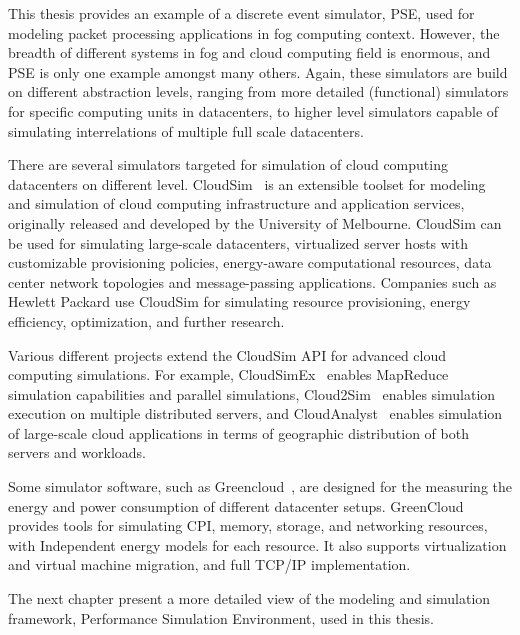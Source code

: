 This thesis provides an example of a discrete event simulator, PSE, used for modeling packet processing applications in fog computing context. However, the breadth of different systems in fog and cloud computing field is enormous, and PSE is only one example amongst many others. Again, these simulators are build on different abstraction levels, ranging from more detailed (functional) simulators for specific computing units in datacenters, to higher level simulators capable of simulating interrelations of multiple full scale datacenters.

There are several simulators targeted for simulation of cloud computing datacenters on different level. CloudSim~\cite{Calheiros:2011:Cloudsim} is an extensible toolset for modeling and simulation of cloud computing infrastructure and application services, originally released and developed by the University of Melbourne. CloudSim can be used for simulating large-scale datacenters, virtualized server hosts with customizable provisioning policies, energy-aware computational resources, data center network topologies and message-passing applications. Companies such as Hewlett Packard use CloudSim for simulating resource provisioning, energy efficiency, optimization, and further research.

Various different projects extend the CloudSim API for advanced cloud computing simulations. For example, CloudSimEx~\cite{CloudSimEx} enables MapReduce~\cite{Dean:2008:MR} simulation capabilities and parallel simulations, Cloud2Sim~\cite{Kathiravelu:2014:Concurrent} enables simulation execution on multiple distributed servers, and CloudAnalyst~\cite{Wickremasinghe:2010:CloudAnalyst} enables simulation of large-scale cloud applications in terms of geographic distribution of both servers and workloads.

Some simulator software, such as Greencloud~\cite{Kliazovich:2010:GreenCloud}, are designed for the measuring the energy and power consumption of different datacenter setups. GreenCloud provides tools for simulating CPI, memory, storage, and networking resources, with Independent energy models for each resource. It also supports virtualization and virtual machine migration, and full TCP/IP implementation.

The next chapter present a more detailed view of the modeling and simulation framework, Performance Simulation Environment, used in this thesis.

